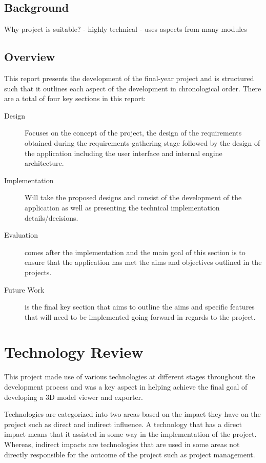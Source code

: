 \documentclass[11pt]{article}
\begin{document}
\subsection{Background}
Why project is suitable?
- highly technical 
- uses aspects from many modules


\subsection{Overview}
This report presents the development of the final-year project and is structured
such that it outlines each aspect of the development in chronological order.
There are a total of four key sections in this report:
\begin{description}
  \item[Design] Focuses on the concept of the project, the design of the
    requirements obtained during the requirements-gathering stage followed by
    the design of the application including the user interface and internal
    engine architecture.
  \item[Implementation] Will take the proposed designs and consist of the
    development of the application as well as presenting the technical
    implementation details/decisions.
  \item[Evaluation] comes after the implementation and the main goal of this
    section is to ensure that the application has met the aims and objectives
    outlined in the projects.
  \item[Future Work] is the final key section that aims to outline the aims and
    specific features that will need to be implemented going forward in regards
    to the project.
\end{description}

\clearpage
\section{Technology Review} \label{technology_review}
This project made use of various technologies at different stages throughout the
development process and was a key aspect in helping achieve the final goal of
developing a 3D model viewer and exporter.

Technologies are categorized into two areas based on the impact they have on the
project such as direct and indirect influence. A technology that has a direct
impact means that it assisted in some way in the implementation of the project.
Whereas, indirect impacts are technologies that are used in some areas not
directly responsible for the outcome of the project such as project management.
\end{document}
